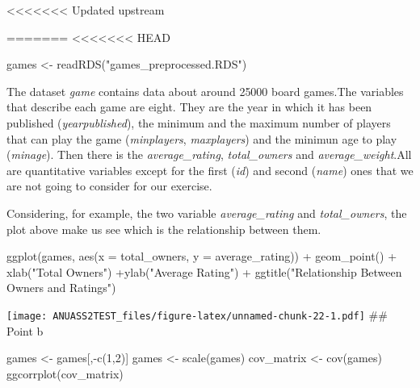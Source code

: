 \documentclass[
]{article}
\newenvironment{Shaded}{\begin{snugshade}}{\end{snugshade}}
\newcommand{\AttributeTok}[1]{\textcolor[rgb]{0.77,0.63,0.00}{#1}}
\newcommand{\DecValTok}[1]{\textcolor[rgb]{0.00,0.00,0.81}{#1}}
\newcommand{\FunctionTok}[1]{\textcolor[rgb]{0.00,0.00,0.00}{#1}}
\newcommand{\NormalTok}[1]{#1}
\newcommand{\OtherTok}[1]{\textcolor[rgb]{0.56,0.35,0.01}{#1}}
\newcommand{\SpecialCharTok}[1]{\textcolor[rgb]{0.00,0.00,0.00}{#1}}
\newcommand{\StringTok}[1]{\textcolor[rgb]{0.31,0.60,0.02}{#1}}
\begin{document}
\textless\textless\textless\textless\textless\textless\textless{}
Updated upstream

=======
\textless\textless\textless\textless\textless\textless\textless{} HEAD

\begin{Shaded}
\begin{Highlighting}[]
\NormalTok{games }\OtherTok{\textless{}{-}} \FunctionTok{readRDS}\NormalTok{(}\StringTok{"games\_preprocessed.RDS"}\NormalTok{)}
\end{Highlighting}
\end{Shaded}

The dataset \emph{game} contains data about around 25000 board games.The
variables that describe each game are eight. They are the year in which
it has been published (\emph{yearpublished}), the minimum and the
maximum number of players that can play the game (\emph{minplayers},
\emph{maxplayers}) and the minimun age to play (\emph{minage}). Then
there is the \emph{average\_rating}, \emph{total\_owners} and
\emph{average\_weight}.All are quantitative variables except for the
first (\emph{id}) and second (\emph{name}) ones that we are not going to
consider for our exercise.

Considering, for example, the two variable \emph{average\_rating} and
\emph{total\_owners}, the plot above make us see which is the
relationship between them.

\begin{Shaded}
\begin{Highlighting}[]
\FunctionTok{ggplot}\NormalTok{(games, }\FunctionTok{aes}\NormalTok{(}\AttributeTok{x =}\NormalTok{ total\_owners, }\AttributeTok{y =}\NormalTok{ average\_rating)) }\SpecialCharTok{+}
  \FunctionTok{geom\_point}\NormalTok{() }\SpecialCharTok{+} \FunctionTok{xlab}\NormalTok{(}\StringTok{"Total Owners"}\NormalTok{) }\SpecialCharTok{+}\FunctionTok{ylab}\NormalTok{(}\StringTok{"Average Rating"}\NormalTok{) }\SpecialCharTok{+}
  \FunctionTok{ggtitle}\NormalTok{(}\StringTok{"Relationship Between Owners and Ratings"}\NormalTok{)}
\end{Highlighting}
\end{Shaded}

\texttt{[image: ANUASS2TEST\_files/figure-latex/unnamed-chunk-22-1.pdf]}
\#\# Point b

\begin{Shaded}
\begin{Highlighting}[]
\NormalTok{games }\OtherTok{\textless{}{-}}\NormalTok{ games[,}\SpecialCharTok{{-}}\FunctionTok{c}\NormalTok{(}\DecValTok{1}\NormalTok{,}\DecValTok{2}\NormalTok{)]}
\NormalTok{games }\OtherTok{\textless{}{-}} \FunctionTok{scale}\NormalTok{(games)}
\NormalTok{cov\_matrix }\OtherTok{\textless{}{-}} \FunctionTok{cov}\NormalTok{(games)}
\FunctionTok{ggcorrplot}\NormalTok{(cov\_matrix)}
\end{Highlighting}
\end{Shaded}
\end{document}
